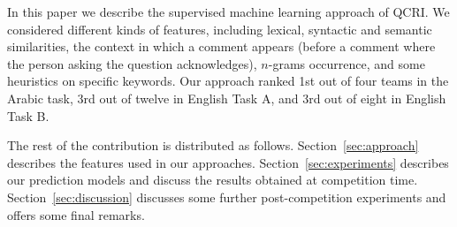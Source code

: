 In this paper we describe the supervised machine learning approach of QCRI\@. 
We 
considered different kinds of features, including lexical, syntactic and 
semantic similarities, the context in which a comment appears (\eg before a 
comment where the person asking the question acknowledges), $n$-grams 
occurrence, and some heuristics on specific keywords. Our approach ranked 1st 
out of four teams in the Arabic task, 3rd out of twelve in English Task A, and 
3rd out of eight in English Task B. 

The rest of the contribution is distributed as follows. 
Section~\ref{sec:approach} describes the features used in our approaches. 
Section~\ref{sec:experiments} describes our prediction models and discuss the 
results obtained at competition time. Section~\ref{sec:discussion} discusses 
some further post-competition experiments and offers some final remarks.

